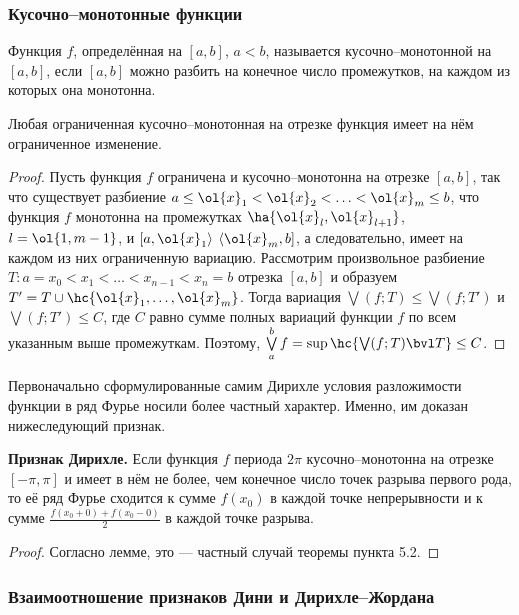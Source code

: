 \documentclass[a4paper]{article}
\newenvironment{lem*}{\par\vskip\theoremskip\textbf{Лемма.}\normalfont \itshape}{\par\vskip\theoremskip}
\begin{document}
\subsubsection{Кусочно--монотонные функции}

\begin{df}
Функция $f$, определённая на $[a,b]$, $a<b$, называется
кусочно--монотонной на $[a,b]$, если $[a,b]$ можно разбить на
конечное число промежутков, на каждом из которых она монотонна.
\end{df}

\begin{lem*}
Любая ограниченная кусочно--монотонная на отрезке функция имеет на
нём ограниченное изменение.
\end{lem*}

\begin{proof}
Пусть функция $f$ ограничена и кусочно--монотонна на отрезке
$[a,b]$, так что существует разбиение $a\le \ol{x}_1 < \ol{x}_2 <
\ldots < \ol{x}_m \le b$, что функция $f$ монотонна на промежутках
$\ha{\ol{x}_l, \ol{x}_{l+1}}$, $l=\ol{1,m-1}$, и $\left[ a, \ol{x}_1
\right>$ $\left< \ol{x}_m,b\right]$, а следовательно, имеет на
каждом из них ограниченную вариацию. Рассмотрим произвольное
разбиение $T\colon a=x_0 < x_1 < \ldots < x_{n-1} < x_n = b$ отрезка
$[a,b]$ и образуем $T' = T\cup \hc{\ol{x}_1,\ldots, \ol{x}_m}$.
Тогда вариация $\bigvee(f;T) \le \bigvee(f;T')$ и $\bigvee(f;T')\le
C$, где $C$ равно сумме полных вариаций функции $f$ по всем
указанным выше промежуткам. Поэтому, $\bigvee\limits_a^b f = \sup
\hc{\bigvee(f;T) \bvl T} \le C$.
\end{proof}

Первоначально сформулированные самим Дирихле условия разложимости
функции в ряд Фурье носили более частный характер. Именно, им
доказан нижеследующий признак.

\textbf{Признак Дирихле.} Если функция $f$ периода $2\pi$
кусочно--монотонна на отрезке $[-\pi,\pi]$ и имеет в нём не более,
чем конечное число точек разрыва первого рода, то её ряд Фурье
сходится к сумме $f(x_0)$ в каждой точке непрерывности и к сумме
$\frac{f(x_0+0) + f(x_0-0)}2$ в каждой точке разрыва.

\begin{proof}
Согласно лемме, это --- частный случай теоремы пункта 5.2.
\end{proof}

\subsubsection{Взаимоотношение признаков Дини и Дирихле--Жордана}
\end{document}
